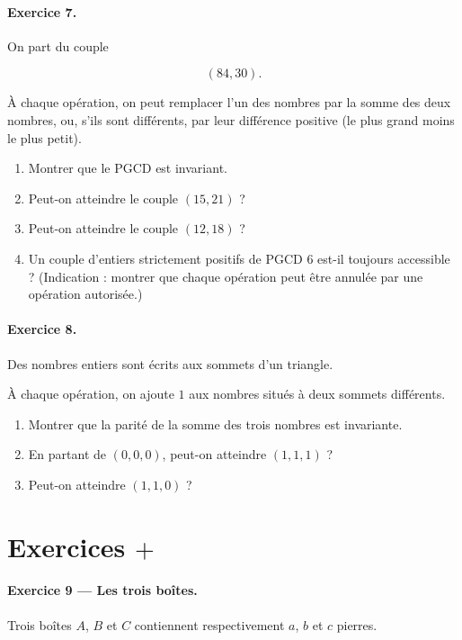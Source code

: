 \paragraph{Exercice 7.}
On part du couple

\[
(84,30).
\]

À chaque opération, on peut remplacer l'un des nombres par la somme des deux
nombres, ou, s'ils sont différents, par leur différence positive (le plus grand
moins le plus petit).

\begin{enumerate}
    \item Montrer que le PGCD est invariant.
    \item Peut-on atteindre le couple \((15,21)\) ?
    \item Peut-on atteindre le couple \((12,18)\) ?
    \item Un couple d'entiers strictement positifs de PGCD \(6\) est-il
    toujours accessible ? (Indication : montrer que chaque opération peut être
    annulée par une opération autorisée.)
\end{enumerate}

\paragraph{Exercice 8.}
Des nombres entiers sont écrits aux sommets d'un triangle.

À chaque opération, on ajoute \(1\) aux nombres situés à deux sommets
différents.

\begin{enumerate}
    \item Montrer que la parité de la somme des trois nombres est invariante.
    \item En partant de \((0,0,0)\), peut-on atteindre \((1,1,1)\) ?
    \item Peut-on atteindre \((1,1,0)\) ?
\end{enumerate}

\section{Exercices \(+\)}

\paragraph{Exercice 9 --- Les trois boîtes.}
Trois boîtes \(A\), \(B\) et \(C\) contiennent respectivement \(a\), \(b\) et
\(c\) pierres.

